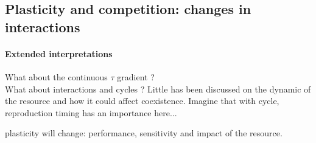 \subsection{Plasticity and competition: changes in interactions}

\paragraph{Extended interpretations}
What about the continuous $\tau$ gradient ?\\

What about interactions and cycles ? Little has been discussed on the dynamic of the resource and how it could affect coexistence. Imagine that with cycle, reproduction timing has an importance here...


plasticity will change: performance, sensitivity and impact of the resource.


%
%
%
%
